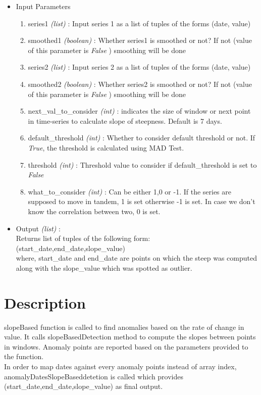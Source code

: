 \begin{itemize}
 \item Input Parameters
 
 \begin{enumerate}
  \item series1 \textit{(list)} : Input series 1 as a list of tuples of the forms (date, value)
  \item smoothed1 \textit{(boolean)} : Whether series1 is smoothed or not? If not (value of this parameter is \textit{False} ) smoothing will be done
  \item series2 \textit{(list)} : Input series 2 as a list of tuples of the forms (date, value)
  \item smoothed2 \textit{(boolean)} : Whether series2 is smoothed or not? If not (value of this parameter is \textit{False} ) smoothing will be done
  \item next{\_}val{\_}to{\_}consider \textit{(int)} : indicates the size of window or next point in time-series to calculate slope of steepness. Default is 7 days.
  \item default{\_}threshold \textit{(int)} : Whether to consider default threshold or not. If \textit{True}, the threshold is calculated using MAD Test.
  \item threshold \textit{(int)} : Threshold value to consider if default\_threshold is set to \textit{False}
  \item what{\_}to{\_}consider \textit{(int)} : Can be either 1,0 or -1. If the series are supposed to move in tandem, 1 is set otherwise -1 is set. In case we don't know the correlation between two, 0 is set.
  \end{enumerate}

 \item Output \textit{(list)} : \\
 	Returns list of tuples of the following form: \\ 
 	(start\_date,end\_date,slope\_value)\\
 	where, start\_date and end\_date are points on which the steep was computed along with the slope\_value which was spotted as outlier.
 
\end{itemize}

\section{Description}

slopeBased function is called to find anomalies based on the rate of change in value. It calls slopeBasedDetection method to compute the slopes between points in windows. 
Anomaly points are reported based on the parameters provided to the function. \\
In order to map dates against every anomaly points instead of array index, anomalyDatesSlopeBaseddetetion is called which provides (start\_date,end\_date,slope\_value) as final output.